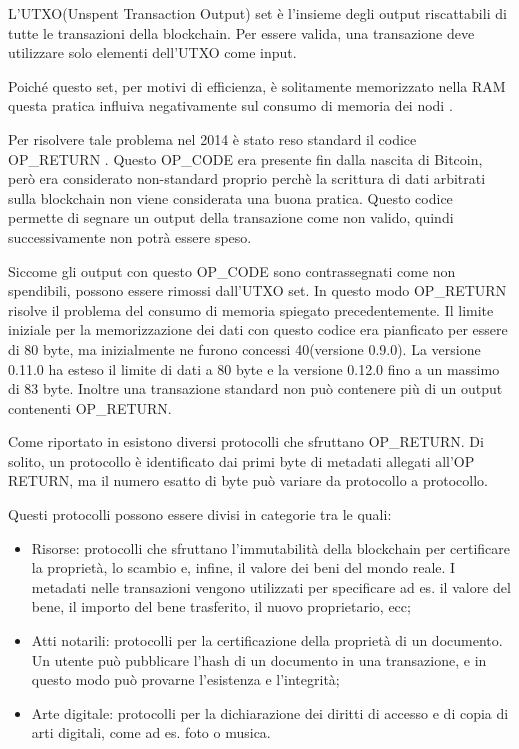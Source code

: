 L'UTXO(Unspent Transaction Output) set è l'insieme degli output riscattabili di tutte le transazioni della blockchain. Per essere valida, una transazione deve utilizzare solo elementi dell'UTXO come input.

Poiché questo set, per motivi di efficienza, è solitamente memorizzato nella RAM \cite{utxo} questa pratica influiva negativamente sul consumo di memoria dei nodi \cite{stresstest}.

Per risolvere tale problema nel 2014 è stato reso standard il codice OP\_RETURN \cite{opreturnstandard} . Questo OP\_CODE era presente fin dalla nascita di Bitcoin, però era considerato non-standard proprio perchè la scrittura di dati arbitrati sulla blockchain non viene considerata una buona pratica. Questo codice permette di segnare un output della transazione come non valido, quindi successivamente non potrà essere speso.

Siccome gli output con questo OP\_CODE sono contrassegnati come non spendibili, possono essere rimossi dall'UTXO set. In questo modo OP\_RETURN risolve il problema del consumo di memoria spiegato precedentemente. Il limite iniziale per la memorizzazione dei dati con questo codice era pianficato per essere di 80 byte, ma inizialmente ne furono concessi 40(versione 0.9.0).  La versione 0.11.0 \cite{v11} ha esteso il limite di dati a 80 byte e la versione 0.12.0 \cite{v12} fino a un massimo di 83 byte. Inoltre una transazione standard non può contenere più di un output contenenti OP\_RETURN.

Come riportato in \cite{OP_RETURN} esistono diversi protocolli che sfruttano OP\_RETURN. Di solito, un protocollo è identificato dai primi byte di metadati allegati all'OP RETURN, ma il numero esatto di byte può variare da protocollo a
protocollo. 

Questi protocolli possono essere divisi in categorie tra le quali:
\begin{itemize}
    \item Risorse: protocolli che sfruttano l'immutabilità della blockchain per certificare la proprietà, lo scambio e, infine, il valore dei beni del mondo reale. I metadati nelle transazioni vengono utilizzati per specificare ad es. il valore del bene, il importo del bene trasferito, il nuovo proprietario, ecc;  
    \item Atti notarili: protocolli per la certificazione della proprietà di un documento. Un utente può pubblicare l'hash di un documento in una transazione, e in questo modo può provarne l'esistenza e l'integrità;
    \item Arte digitale: protocolli per la dichiarazione dei diritti di accesso e di copia di arti digitali, come ad es. foto o musica.
\end{itemize}

